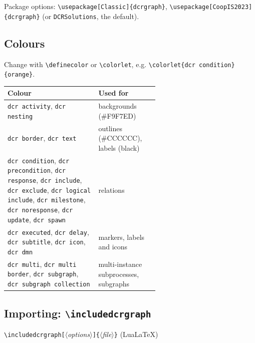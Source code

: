 \documentclass[a4paper,11pt]{article}
\newcommand\cs[1]{\texttt{\textbackslash#1}}
\newcommand\key[1]{\texttt{#1}}
\newcommand\meta[1]{\ensuremath{\langle}\textit{#1}\ensuremath{\rangle}}
\newcommand\marg[1]{\texttt{\{}\meta{#1}\texttt{\}}}
\newcommand\oarg[1]{\texttt{[}\meta{#1}\texttt{]}}
\begin{document}
\medskip\noindent
Package options: \cs{usepackage[Classic]\{dcrgraph\}},
\cs{usepackage[CoopIS2023]\{dcrgraph\}} (or \key{DCRSolutions}, the default).

\subsection{Colours}\label{sec:colours}
Change with \cs{definecolor} or \cs{colorlet}, e.g.
\cs{colorlet\{dcr condition\}\{orange\}}.

\medskip
\begin{tabularx}{\linewidth}{@{}>{\raggedright\arraybackslash}p{0.6\linewidth}L@{}}
\toprule
Colour & Used for\\
\midrule
\key{dcr activity}, \key{dcr nesting} & backgrounds (\#F9F7ED)\\
\key{dcr border}, \key{dcr text} & outlines (\#CCCCCC), labels (black)\\
\key{dcr condition}, \key{dcr precondition}, \key{dcr response},
\key{dcr include}, \key{dcr exclude}, \key{dcr logical include},
\key{dcr milestone}, \key{dcr noresponse}, \key{dcr update},
\key{dcr spawn} & relations\\
\key{dcr executed}, \key{dcr delay}, \key{dcr subtitle}, \key{dcr icon},
\key{dcr dmn} & markers, labels and icons\\
\key{dcr multi}, \key{dcr multi border}, \key{dcr subgraph},
\key{dcr subgraph collection} & multi-instance subprocesses, subgraphs\\
\bottomrule
\end{tabularx}

\subsection{Importing: \texorpdfstring{\cs{includedcrgraph}}{includedcrgraph}}\label{sec:include}
\cs{includedcrgraph}\oarg{options}\marg{file} \quad (Lua\LaTeX)
\end{document}
